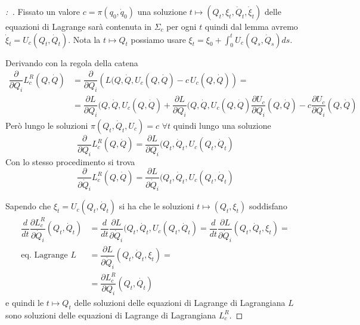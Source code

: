 \documentclass[11pt,a4paper,twoside]{book}
\newenvironment{dimo}[1][\proofname]{
	\begin{tcolorbox}[
	breakable, 
	enhanced, 
	interior hidden, 
	frame hidden, 
	borderline west = {1pt}{0pt}{gray}, 
	top=0pt, bottom=0pt, left=0pt]
\begin{proof}[#1:~]
}
{
\end{proof}
\end{tcolorbox}
}
\theoremstyle{esss}
\theoremstyle{dotless}
\numberwithin{equation}{section} %
\begin{document}
\begin{dimo}

Fissato un valore $c=\pi(q_0,\dot{q}_0)$ una soluzione $t\mapsto(Q_t,\xi_t,\dot{Q}_t,\dot{\xi}_t)$ delle equazioni di Lagrange sarà contenuta in $\Sigma_c$ per ogni $t$ quindi dal lemma avremo $\dot{\xi}_t=U_c(Q_t,\dot{Q}_t)$. Nota la $t\mapsto Q_t$ possiamo usare $\xi_t=\xi_0+\int_0^t U_c(Q_s,\dot{Q}_s) ds $. 

Derivando con la regola della catena
\begin{align*} 
\dfrac{\partial }{\partial Q_i}L^R_c(Q,\dot{Q}) & =\dfrac{\partial}{\partial Q_i} \left( L(Q,\dot{Q},U_c(Q,\dot{Q}) - c\,U_c(Q,\dot{Q}) \right)=\\
&=\dfrac{\partial L}{\partial Q_i}(Q,\dot{Q},U_c(Q,\dot{Q}) + \dfrac{\partial L}{\partial Q_i}(Q,\dot{Q},U_c(Q,\dot{Q})\dfrac{\partial U_c}{\partial Q_i}(Q,\dot{Q}) -c\dfrac{\partial U_c}{\partial Q_i}(Q,\dot{Q})
\end{align*}
Però lungo le soluzioni $\pi(Q_t,\dot{Q}_t,U_c)=c$ $\forall t$ quindi lungo una soluzione
\[
\dfrac{\partial }{\partial Q_i}L^R_c(Q,\dot{Q}) =\dfrac{\partial L}{\partial Q_i}(Q_t,\dot{Q}_t,U_c(Q_t,\dot{Q}_t)
\] 
Con lo stesso procedimento si trova
\[
\dfrac{\partial }{\partial \dot{Q}_i}L^R_c(Q,\dot{Q}) =\dfrac{\partial L}{\partial \dot{Q}_i}(Q_t,\dot{Q}_t,U_c(Q_t,\dot{Q}_t)
\] 

Sapendo che $\xi_t = U_c(Q_t,\dot{Q}_t)$ si ha che le soluzioni $t\mapsto(Q_t,\xi_t)$ soddisfano
\begin{align*}
\dfrac{d}{dt}\dfrac{\partial L_c^R}{\partial \dot{Q}_{i}}(Q_t,\dot{Q}_t) &= \dfrac{d}{dt} \dfrac{\partial L}{\partial \dot{Q}_i}(Q_t,\dot{Q}_t,U_c(Q_t,\dot{Q}_t)=  \dfrac{d}{dt} \dfrac{\partial L}{\partial \dot{Q}_i}(Q_t,\dot{Q}_t,\xi_t)=\\
\text{eq. Lagrange } L  &=  \dfrac{\partial L}{\partial \dot{Q}_i}(Q_t,\dot{Q}_t,\xi_t)=\\
&=\dfrac{\partial L^R_c}{\partial Q_i}(Q_t,\dot{Q_t})
\end{align*}
e quindi le $t\mapsto Q_t$ delle soluzioni delle equazioni di Lagrange di Lagrangiana $L$ sono soluzioni delle equazioni di Lagrange di Lagrangiana $L^R_c$. \qedhere
\end{dimo}
\end{document}
